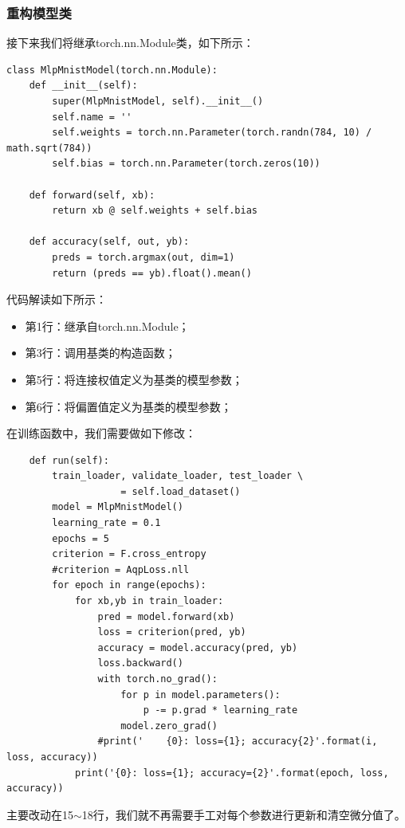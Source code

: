 \documentclass[UTF8]{article}
\begin{document}
\subsubsection{重构模型类}
接下来我们将继承torch.nn.Module类，如下所示：
\begin{lstlisting}
class MlpMnistModel(torch.nn.Module):
    def __init__(self):
        super(MlpMnistModel, self).__init__()
        self.name = ''
        self.weights = torch.nn.Parameter(torch.randn(784, 10) / math.sqrt(784))
        self.bias = torch.nn.Parameter(torch.zeros(10))

    def forward(self, xb):
        return xb @ self.weights + self.bias

    def accuracy(self, out, yb):
        preds = torch.argmax(out, dim=1)
        return (preds == yb).float().mean()
\end{lstlisting}
代码解读如下所示：
\begin{itemize}
\item 第1行：继承自torch.nn.Module；
\item 第3行：调用基类的构造函数；
\item 第5行：将连接权值定义为基类的模型参数；
\item 第6行：将偏置值定义为基类的模型参数；
\end{itemize}
在训练函数中，我们需要做如下修改：
\begin{lstlisting}
    def run(self):
        train_loader, validate_loader, test_loader \
                    = self.load_dataset()
        model = MlpMnistModel()
        learning_rate = 0.1
        epochs = 5
        criterion = F.cross_entropy
        #criterion = AqpLoss.nll
        for epoch in range(epochs):
            for xb,yb in train_loader:
                pred = model.forward(xb)
                loss = criterion(pred, yb)
                accuracy = model.accuracy(pred, yb)
                loss.backward()
                with torch.no_grad():
                    for p in model.parameters(): 
                        p -= p.grad * learning_rate
                    model.zero_grad()
                #print('    {0}: loss={1}; accuracy{2}'.format(i, loss, accuracy))
            print('{0}: loss={1}; accuracy={2}'.format(epoch, loss, accuracy))
\end{lstlisting}
主要改动在15$\sim$18行，我们就不再需要手工对每个参数进行更新和清空微分值了。
\end{document}
